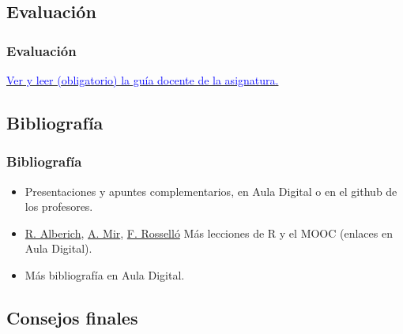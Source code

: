 \documentclass[12pt,t]{beamer}
\newcommand{\blue}[1]{\textcolor{blue}{#1}}
\theoremstyle{plain}
\theoremstyle{definition}
\begin{document}
\subsection{Evaluación}

\begin{frame}
\frametitle{Evaluación}
\medskip

\href{https://estudis.uib.cat/guia_docent/2018-19/20305/1/es/guia_docent.pdf}{\blue{Ver y leer (obligatorio) la guía docente de la asignatura.}}
\end{frame}


\subsection{Bibliografía}

\begin{frame}
\frametitle{Bibliografía}
\begin{itemize} 

\item Presentaciones y apuntes complementarios, en Aula Digital o en el github de los profesores.
\medskip

\item \href{https://www.uib.es/es/personal/ABDI0ODk/}{R. Alberich}, \href{https://www.uib.es/es/personal/ABDMyNjc/}{A. Mir}, \href{https://www.uib.es/es/personal/ABDUyODM/}{F. Rosselló} Más lecciones de R y el MOOC (enlaces en Aula Digital).
\medskip

\item Más bibliografía en Aula Digital.
\medskip

\end{itemize}

\end{frame}


\subsection{Consejos finales}
\end{document}
